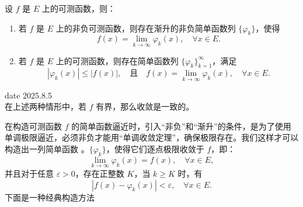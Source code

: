 \documentclass[lang=cn,10pt]{elegantbook}
\begin{document}
\begin{theorem}[可测函数是简单函数的极限]
设 $f$ 是 $E$ 上的可测函数，则：

\begin{enumerate}[(1)]
    \item 若 $f$ 是 $E$ 上的非负可测函数，则存在渐升的非负简单函数列 $\{\varphi_k\}$，使得
    \[
    f(x) = \lim_{k \to \infty} \varphi_k(x), \quad \forall x \in E.
    \]

    \item 若 $f$ 是 $E$ 上的可测函数，则存在简单函数列 $\{\varphi_k\}_{k=1}^\infty$，满足
    \[
    |\varphi_k(x)| \leq |f(x)|, \quad \text{且} \quad f(x) = \lim_{k \to \infty} \varphi_k(x), \quad \forall x \in E.
    \]
\end{enumerate}
date 2025.8.5\\
在上述两种情形中，若 $f$ 有界，那么收敛是一致的。
\end{theorem}
在构造可测函数 $f$ 的简单函数逼近时，引入“非负”和“渐升”的条件，是为了使用单调极限逼近，必须非负才能用“单调收敛定理”，确保极限存在。我们这样才可以构造出一列简单函数
 。$\{\varphi_k\}$，使得它们逐点极限收敛于 $f$，即：
\[
\lim_{k \to \infty} \varphi_k(x) = f(x), \quad \forall x \in E,
\]
并且对于任意 $\varepsilon > 0$，存在正整数 $K$，当 $k \geq K$ 时，有
\[
|f(x) - \varphi_k(x)| < \varepsilon, \quad \forall x \in E.
\]
下面是一种经典构造方法
\end{document}
